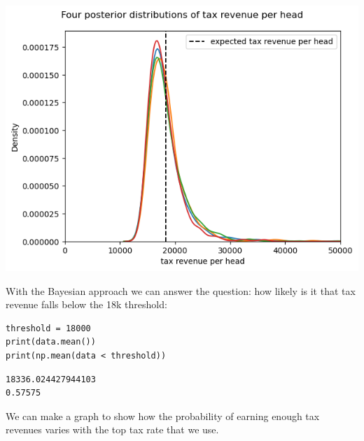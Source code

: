 \documentclass[11pt]{article}
\begin{document}
\begin{center}
\includegraphics[width=.9\linewidth]{./figures/average_tax_income_distributions.png}
\label{}
\end{center}


With the Bayesian approach we can answer the question: how likely is it that tax revenue falls below the 18k threshold:

\begin{verbatim}
threshold = 18000
print(data.mean())
print(np.mean(data < threshold))
\end{verbatim}

\label{}
\begin{verbatim}
18336.024427944103
0.57575
\end{verbatim}



We can make a graph to show how the probability of earning enough tax revenues varies with the top tax rate that we use.
\end{document}
